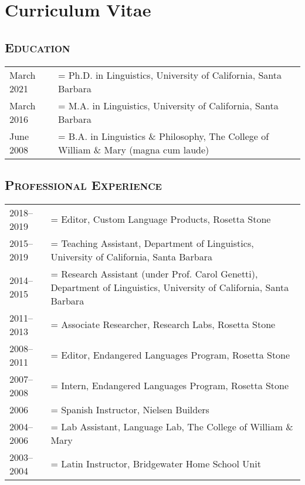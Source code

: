 \newlength{\datewidth}
\setlength{\datewidth}{6.5em}

\renewcommand{\arraystretch}{1.5}

\newenvironment{cvsection}[1]
{%
  \subsection*{\large\scshape#1}
  \vspace{-1em}
  \begin{longtabu} to \textwidth { p{\datewidth} >{\hangindent=\defaulthang}X[l] }
}
{\end{longtabu}}

\clearpage
{}
\singlespacing

\section*{Curriculum Vitae}
\label{sec:cv}

\begin{center}
  \theauthor
\end{center}

\begin{cvsection}{Education}
  March 2021 & Ph.D. in Linguistics, University of California, Santa Barbara\\
  March 2016 & M.A. in Linguistics, University of California, Santa Barbara\\
  June 2008  & B.A. in Linguistics \& Philosophy, The College of William \& Mary (magna cum laude)
\end{cvsection}

\begin{cvsection}{Professional Experience}
  2018--2019 & Editor, Custom Language Products, Rosetta Stone\\
  2015--2019 & Teaching Assistant, Department of Linguistics, University of California, Santa Barbara\\
  2014--2015 & Research Assistant (under Prof. Carol Genetti), Department of Linguistics, University of California, Santa Barbara\\
  2011--2013 & Associate Researcher, Research Labs, Rosetta Stone\\
  2008--2011 & Editor, Endangered Languages Program, Rosetta Stone\\
  2007--2008 & Intern, Endangered Languages Program, Rosetta Stone\\
  2006       & Spanish Instructor, Nielsen Builders\\
  2004--2006 & Lab Assistant, Language Lab, The College of William \& Mary\\
  2003--2004 & Latin Instructor, Bridgewater Home School Unit
\end{cvsection}

